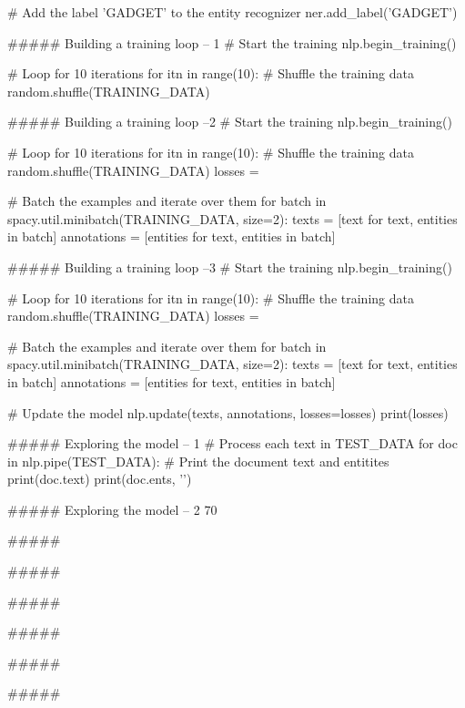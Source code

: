 # Add the label 'GADGET' to the entity recognizer
ner.add_label('GADGET')


##### Building a training loop  -- 1
# Start the training
nlp.begin_training()

# Loop for 10 iterations
for itn in range(10):
    # Shuffle the training data
    random.shuffle(TRAINING_DATA)


##### Building a training loop  --2
# Start the training
nlp.begin_training()

# Loop for 10 iterations
for itn in range(10):
    # Shuffle the training data
    random.shuffle(TRAINING_DATA)
    losses = {}
    
    # Batch the examples and iterate over them
    for batch in spacy.util.minibatch(TRAINING_DATA, size=2):
        texts = [text for text, entities in batch]
        annotations = [entities for text, entities in batch]


##### Building a training loop  --3
# Start the training
nlp.begin_training()

# Loop for 10 iterations
for itn in range(10):
    # Shuffle the training data
    random.shuffle(TRAINING_DATA)
    losses = {}
    
    # Batch the examples and iterate over them
    for batch in spacy.util.minibatch(TRAINING_DATA, size=2):
        texts = [text for text, entities in batch]
        annotations = [entities for text, entities in batch]
        
        # Update the model
        nlp.update(texts, annotations, losses=losses)
        print(losses)


##### Exploring the model  -- 1
# Process each text in TEST_DATA
for doc in nlp.pipe(TEST_DATA):
    # Print the document text and entitites
    print(doc.text)
    print(doc.ents, '\n\n')


##### Exploring the model  -- 2
70%


##### 



##### 



##### 



##### 



##### 



##### 



